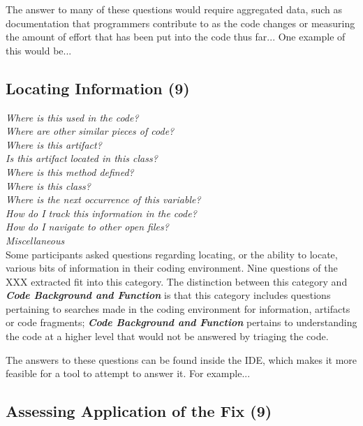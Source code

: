 \documentclass[conference]{IEEEtran}
\begin{document}
The answer to many of these questions would require aggregated data, such as documentation that programmers contribute to as the code changes or measuring the amount of effort that has been put into the code thus far...
One example of this would be...



\noindent\subsection{\textbf{Locating Information (9)}}

\noindent\emph{Where is this used in the code?} \\
\emph{Where are other similar pieces of code?} \\
\emph{Where is this artifact?} \\
\emph{Is this artifact located in this class?} \\
\emph{Where is this method defined?} \\
\emph{Where is this class? } \\
\emph{Where is the next occurrence of this variable?} \\
\emph{How do I track this information in the code?} \\
\emph{How do I navigate to other open files?} \\
\emph{Miscellaneous} \\

Some participants asked questions regarding locating, or the ability to locate, various bits of information in their coding environment. Nine questions of the XXX extracted fit into this category. The distinction between this category and \emph{\textbf{Code Background and Function}} is that this category includes questions pertaining to searches made in the coding environment for information, artifacts or code fragments; \emph{\textbf{Code Background and Function}} pertains to understanding the code at a higher level that would not be answered by triaging the code.

The answers to these questions can be found inside the IDE, which makes it more feasible for a tool to attempt to answer it. For example... 



\noindent\subsection{\textbf{Assessing Application of the Fix (9)}}
\end{document}
